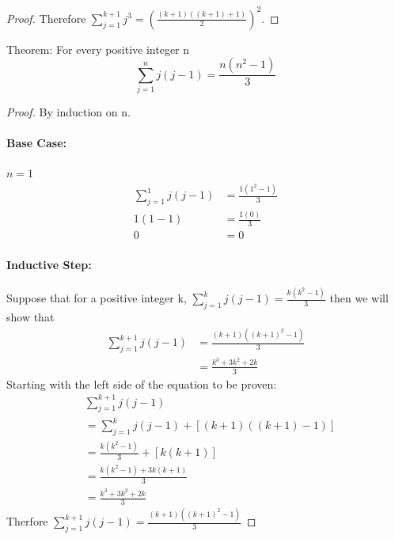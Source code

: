 \documentclass[11pt, letterpaper, twocolumn, fleqn]{article}
\begin{document}
\begin{enumerate}
\begin{proof}
                  Therefore $\sum_{j=1}^{k+1} j^3 = \left( \frac{(k+1)((k+1)+1)}{2} \right)   ^2$.
              \end{proof} 
            \addtocounter{enumi}{1}
            \item Theorem: For every positive integer n
              $$\sum_{j=1}^{n} j(j-1) = \frac{n(n^2-1)}{3}$$
              \begin{proof} By induction on n.
                \item \paragraph{Base Case:} $n=1$
                  \begin{align*}
                    \sum_{j=1}^{1} j(j-1) &= \frac{1(1^2-1)}{3} \\
                    1(1-1) &= \frac{1(0)}{3} \\
                    0 &= 0
                  \end{align*}
                \item \paragraph{Inductive Step:}
                Suppose that for a positive integer k, $\sum_{j=1}^{k} j(j-1) = \frac{k(k^2-1)}{3}$ then we will show that 
                \begin{align*}
                  \sum_{j=1}^{k+1} j(j-1) &= \frac{(k+1)((k+1)^2-1)}{3} \\
                  &= \frac{k^3+3k^2+2k}{3}
                \end{align*}
                Starting with the left side of the equation to be proven:
                \begin{align*}
                  &\sum_{j=1}^{k+1} j(j-1) \\
                  &= \sum_{j=1}^{k} j(j-1) + [(k+1)((k+1)-1)] \\
                  &= \frac{k(k^2-1)}{3} + [k(k+1)] \\
                  &= \frac{k(k^2-1) + 3k(k+1)}{3} \\
                  &= \frac{k^3+3k^2+2k}{3}
                \end{align*}
                Therfore $\sum_{j=1}^{k+1} j(j-1) = \frac{(k+1)((k+1)^2-1)}{3}$
              \end{proof}
        \end{enumerate}
    
\end{document}
